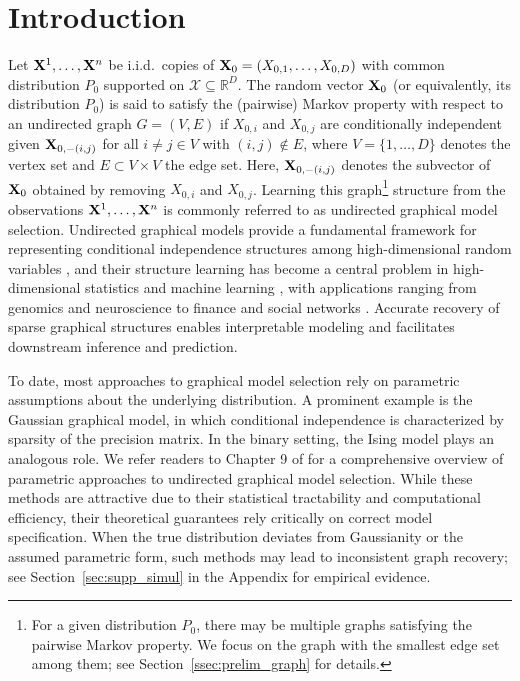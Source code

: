 \documentclass[11pt,a4paper,final]{article}
\numberwithin{equation}{section}
\theoremstyle{remark}
\def\cX{\mathcal X}
\newcommand{\bX}{{\bf X}}
\newcommand{\bbR}{{\mathbb R}}
\newcommand{\be}{\begin{equation}}
\newcommand{\ee}{\end{equation}}
\def\indep{ \!\perp\!\!\!\perp }
\begin{document}
\section{Introduction}
\label{sec:introduction}

Let $\bX^{1}, \ldots, \bX^{n}$ be i.i.d.\ copies of $\bX_0 = (X_{0,1}, \ldots, X_{0,D})$ with common distribution $P_0$ supported on $\cX \subseteq \bbR^{D}$. 
The random vector $\bX_0$ (or equivalently, its distribution $P_0$) is said to satisfy the (pairwise) Markov property with respect to an undirected graph $G = (V,E)$ if $X_{0,i}$ and $X_{0,j}$ are conditionally independent given $\bX_{0,-(i,j)}$ for all $i \neq j \in V$ with $(i,j) \notin E$, where $V = \{1, \ldots, D\}$ denotes the vertex set and $E \subset V \times V$ the edge set.
Here, $\bX_{0,-(i,j)}$ denotes the subvector of $\bX_0$ obtained by removing $X_{0,i}$ and $X_{0,j}$. 
Learning this graph\footnote{For a given distribution $P_{0}$, there may be multiple graphs satisfying the pairwise Markov property. We focus on the graph with the smallest edge set among them; see Section~\ref{ssec:prelim_graph} for details.} structure from the observations $\bX^1, \ldots, \bX^n$ is commonly referred to as undirected graphical model selection. 
Undirected graphical models provide a fundamental framework for representing conditional independence structures among high-dimensional random variables \citep{dawid1979conditional, lauritzen1996graphical, wainwright2008graphical}, and their structure learning has become a central problem in high-dimensional statistics and machine learning \citep{meinshausen2006high}, with applications ranging from genomics \citep{yin2011sparse} and neuroscience \citep{bullmore2009complex} to finance \citep{talih2005structural} and social networks \citep{newman2016structure}. 
Accurate recovery of sparse graphical structures enables interpretable modeling and facilitates downstream inference and prediction. 

To date, most approaches to graphical model selection rely on parametric assumptions about the underlying distribution. 
A prominent example is the Gaussian graphical model, in which conditional independence is characterized by sparsity of the precision matrix. In the binary setting, the Ising model plays an analogous role. 
We refer readers to Chapter 9 of \cite{hastie2015statistical} for a comprehensive overview of parametric approaches to undirected graphical model selection.
While these methods are attractive due to their statistical tractability and computational efficiency, their theoretical guarantees rely critically on correct model specification. 
When the true distribution deviates from Gaussianity or the assumed parametric form, such methods may lead to inconsistent graph recovery; see Section~\ref{sec:supp_simul} in the Appendix for empirical evidence.
\end{document}
